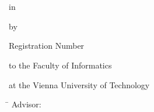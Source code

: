 \begin{center}
{\ \vspace{3.4cm}}

\begin{minipage}[t][2.8cm][s]{\textwidth}%
\centering
\thesistitlefontHUGE\sffamily\bfseries\tuinfthesistitle\\
{\thesistitlefonthuge\sffamily\bfseries\tuinfthesissubtitle}
\end{minipage}

\vspace{1.3cm}

{\thesistitlefontLARGE\sffamily\bfseries \tuinfthesisdegreeen}

\vspace{6mm}

{\thesistitlefontlarge\sffamily in}

\vspace{6mm}

{\thesistitlefontLarge\sffamily\bfseries \tuinfthesiscurriculumen}

\vspace{6.5mm}

{\thesistitlefontlarge\sffamily by}

\vspace{6mm}

{\thesistitlefontLarge\sffamily\bfseries \tuinfthesisauthor}

\vspace{1.5mm}

{\thesistitlefontlarge\sffamily Registration Number \tuinfthesismatrikelno} 

\vspace{1.4cm}

\begin{minipage}[t][1.6cm][t]{\textwidth}%
  \vspace{0pt}\raggedright\thesistitlefontnormalsize\sffamily
  to the Faculty of Informatics 

  at the Vienna University of Technology
\end{minipage}

\vspace{0pt}\raggedright\thesistitlefontnormalsize\sffamily
\begin{minipage}[t][4cm][t]{\textwidth}%
  \begin{tabbing}%
	    \hspace{19mm} \= \hspace{66mm} \kill
	    Advisor: \> \tuinfthesisbetreins\\
     \end{tabbing}
\end{minipage}

\end{center}

